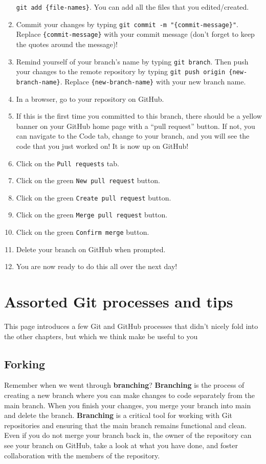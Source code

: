 \documentclass[
]{book}
\begin{document}
\begin{enumerate}
  \texttt{git\ add\ \{file-names\}}. You can add all the files that you edited/created.
\item
  Commit your changes by typing \texttt{git\ commit\ -m\ "\{commit-message\}"}. Replace
  \texttt{\{commit-message\}} with your commit message (don't forget to keep the quotes
  around the message)!
\item
  Remind yourself of your branch's name by typing \texttt{git\ branch}. Then push your
  changes to the remote repository by typing \texttt{git\ push\ origin\ \{new-branch-name\}}.
  Replace \texttt{\{new-branch-name\}} with your new branch name.
\item
  In a browser, go to your repository on GitHub.
\item
  If this is the first time you committed to this branch, there should be a
  yellow banner on your GitHub home page with a ``pull request'' button. If not, you
  can navigate to the Code tab, change to your branch, and you will see the code
  that you just worked on! It is now up on GitHub!
\item
  Click on the \texttt{Pull\ requests} tab.
\item
  Click on the green \texttt{New\ pull\ request} button.
\item
  Click on the green \texttt{Create\ pull\ request} button.
\item
  Click on the green \texttt{Merge\ pull\ request} button.
\item
  Click on the green \texttt{Confirm\ merge} button.
\item
  Delete your branch on GitHub when prompted.
\item
  You are now ready to do this all over the next day!
\end{enumerate}

\chapter{Assorted Git processes and tips}\label{assorted-git-processes-and-tips}

This page introduces a few Git and GitHub processes that didn't nicely fold into the other chapters, but which we think make be useful to you

\section{Forking}\label{forking}

Remember when we went through \textbf{branching}? \textbf{Branching} is the process of creating a new branch where you can make changes to code separately from the main branch. When you finish your changes, you merge your branch into main and delete the branch. \textbf{Branching} is a critical tool for working with Git repositories and ensuring that the main branch remains functional and clean. Even if you do not merge your branch back in, the owner of the repository can see your branch on GitHub, take a look at what you have done, and foster collaboration with the members of the repository.
\end{document}

